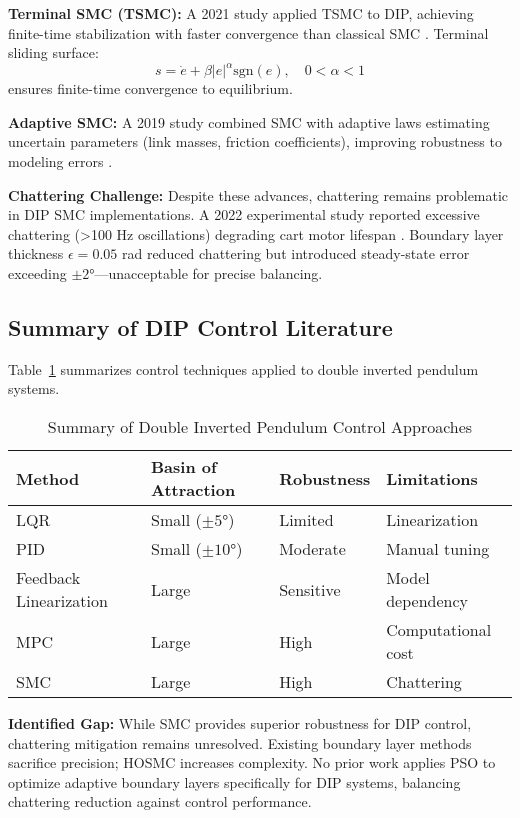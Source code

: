 \textbf{Terminal SMC (TSMC):} A 2021 study applied TSMC to DIP, achieving finite-time stabilization with faster convergence than classical SMC \cite{tsmc2021dip}. Terminal sliding surface:
\begin{equation}
s = \dot{e} + \beta |e|^\alpha \text{sgn}(e), \quad 0 < \alpha < 1
\label{eq:tsmc_surface}
\end{equation}
ensures finite-time convergence to equilibrium.

\textbf{Adaptive SMC:} A 2019 study combined SMC with adaptive laws estimating uncertain parameters (link masses, friction coefficients), improving robustness to modeling errors \cite{adaptive2019dip}.

\textbf{Chattering Challenge:} Despite these advances, chattering remains problematic in DIP SMC implementations. A 2022 experimental study reported excessive chattering (>100 Hz oscillations) degrading cart motor lifespan \cite{experiment2022chattering}. Boundary layer thickness $\epsilon = 0.05$ rad reduced chattering but introduced steady-state error exceeding $\pm 2°$—unacceptable for precise balancing.

\subsection{Summary of DIP Control Literature}

Table~\ref{tab:dip_control} summarizes control techniques applied to double inverted pendulum systems.

\begin{table}[t]
\centering
\caption{Summary of Double Inverted Pendulum Control Approaches}
\label{tab:dip_control}
\begin{tabular}{llll}
\toprule
\textbf{Method} & \textbf{Basin of Attraction} & \textbf{Robustness} & \textbf{Limitations} \\
\midrule
LQR & Small ($\pm 5°$) & Limited & Linearization \\
PID & Small ($\pm 10°$) & Moderate & Manual tuning \\
Feedback Linearization & Large & Sensitive & Model dependency \\
MPC & Large & High & Computational cost \\
SMC & Large & High & Chattering \\
\bottomrule
\end{tabular}
\end{table}

\textbf{Identified Gap:} While SMC provides superior robustness for DIP control, chattering mitigation remains unresolved. Existing boundary layer methods sacrifice precision; HOSMC increases complexity. No prior work applies PSO to optimize adaptive boundary layers specifically for DIP systems, balancing chattering reduction against control performance.

